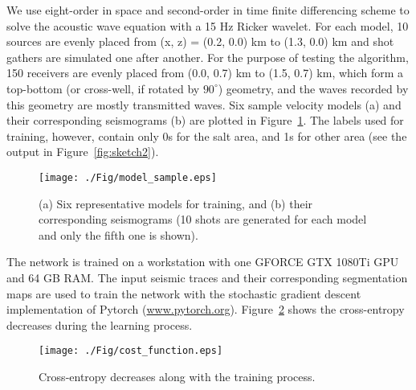 \documentclass{cph18}
\begin{document}
We use eight-order in space and second-order in time finite differencing scheme to solve the acoustic wave equation with a 15 Hz Ricker wavelet.
For each model, 10 sources are evenly placed from (x, z) = (0.2, 0.0) km to (1.3, 0.0) km and shot gathers are simulated one after another. 
For the purpose of testing the algorithm, 150 receivers are evenly placed from (0.0, 0.7) km to (1.5, 0.7) km, which form a top-bottom (or cross-well, if rotated by $90^\circ$) geometry, and the waves recorded by this geometry are mostly transmitted waves. Six sample velocity models (a) and their corresponding seismograms (b) are plotted in Figure~\ref{fig:model_sample}. The labels used for training, however, contain only 0s for the salt area, and 1s for other area (see the output in Figure~\ref{fig:sketch2}). 
\begin{figure}[!htb]
  \centering
  \texttt{[image: ./Fig/model\_sample.eps]}
  \caption{(a) Six representative models for training, and (b) their corresponding seismograms (10 shots are generated for each model and only the fifth one is shown).}
\label{fig:model_sample}
\end{figure}

The network is trained on a workstation with one GFORCE GTX 1080Ti GPU and 64 GB RAM. The input seismic traces and their corresponding segmentation maps are used to train the network with the stochastic gradient descent implementation of Pytorch (\url{www.pytorch.org}). Figure~\ref{fig:cost_function.eps} shows the cross-entropy decreases during the learning process.

\begin{figure}[!htb]
  \centering
  \texttt{[image: ./Fig/cost\_function.eps]}
  \caption{Cross-entropy decreases along with the training process.}
  \label{fig:cost_function.eps}
\end{figure}
\end{document}
